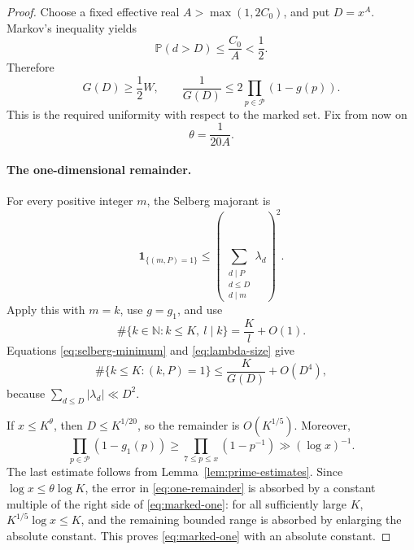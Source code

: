 \documentclass[11pt]{article}
\theoremstyle{definition}
\theoremstyle{remark}
\numberwithin{equation}{section}
\newcommand{\N}{\mathbb N}
\newcommand{\ind}{\mathbf 1}
\begin{document}
\begin{proof}
Choose a fixed effective real \(A>\max(1,2C_0)\), and put
\(D=x^A\). Markov's inequality yields
\[
 \mathbb P(d>D)\le\frac{C_0}{A}<\frac12.
\]
Therefore
\begin{equation}\label{eq:G-uniform}
 G(D)\ge\frac12W,\qquad
 \frac1{G(D)}
 \le2\prod_{p\in\mathcal P}(1-g(p)).
\end{equation}
This is the required uniformity with respect to the marked set.
Fix from now on
\begin{equation}\label{eq:theta}
 \theta=\frac1{20A}.
\end{equation}

\paragraph{The one-dimensional remainder.}
For every positive integer \(m\), the Selberg majorant is
\begin{equation}\label{eq:selberg-majorant}
 \ind_{\{(m,P)=1\}}
 \le
 \left(\sum_{\substack{d\mid P\\d\le D\\d\mid m}}\lambda_d\right)^2.
\end{equation}
Apply this with \(m=k\), use \(g=g_1\), and use
\[
 \#\{k\in\N:k\le K,\ l\mid k\}=\frac Kl+O(1).
\]
Equations \eqref{eq:selberg-minimum} and
\eqref{eq:lambda-size} give
\begin{equation}\label{eq:one-remainder}
 \#\{k\le K:(k,P)=1\}
 \le\frac K{G(D)}+O(D^4),
\end{equation}
because \(\sum_{d\le D}|\lambda_d|\ll D^2\).

If \(x\le K^\theta\), then \(D\le K^{1/20}\), so the remainder
is \(O(K^{1/5})\). Moreover,
\[
 \prod_{p\in\mathcal P}(1-g_1(p))
 \ge\prod_{7\le p\le x}(1-p^{-1})
 \gg(\log x)^{-1}.
\]
The last estimate follows from Lemma~\ref{lem:prime-estimates}.
Since \(\log x\le\theta\log K\), the error in
\eqref{eq:one-remainder} is absorbed by a constant multiple of
the right side of \eqref{eq:marked-one}: for all sufficiently large
\(K\), \(K^{1/5}\log x\le K\), and the remaining bounded range is
absorbed by enlarging the absolute constant. This proves
\eqref{eq:marked-one} with an absolute constant.


\end{proof}
\end{document}

